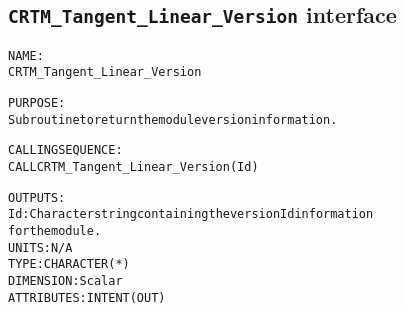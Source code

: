 \subsection{\texttt{CRTM\_Tangent\_Linear\_Version} interface}
  \label{sec:CRTM_Tangent_Linear_Version_interface}
  \begin{alltt}
 
  NAME:
        CRTM_Tangent_Linear_Version
 
  PURPOSE:
        Subroutine to return the module version information.
 
  CALLING SEQUENCE:
        CALL CRTM_Tangent_Linear_Version( Id )
 
  OUTPUTS:
        Id:            Character string containing the version Id information
                       for the module.
                       UNITS:      N/A
                       TYPE:       CHARACTER(*)
                       DIMENSION:  Scalar
                       ATTRIBUTES: INTENT(OUT)
 
  \end{alltt}
